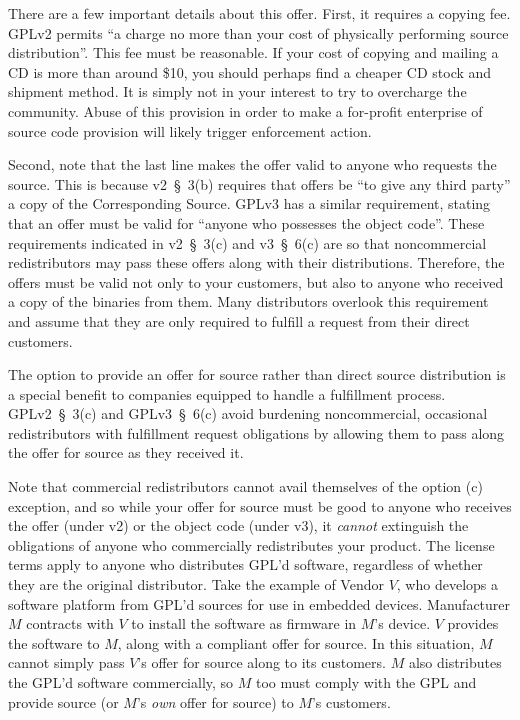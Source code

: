 There are a few important details about this offer.  First, it requires a
copying fee.  GPLv2 permits ``a charge no more than your cost of
physically performing source distribution''.  This fee must be reasonable.
If your cost of copying and mailing a CD is more than around \$10, you
should perhaps find a cheaper CD stock and shipment method.  It is simply
not in your interest to try to overcharge the community.  Abuse of this
provision in order to make a for-profit enterprise of source code
provision will likely trigger enforcement action.

Second, note that the last line makes the offer valid to anyone who
requests the source.  This is because v2~\S~3(b) requires that offers be
``to give any third party'' a copy of the Corresponding Source.  GPLv3 has
a similar requirement, stating that an offer must be valid for ``anyone
who possesses the object code''.  These requirements indicated in
v2~\S~3(c) and v3~\S~6(c) are so that noncommercial redistributors may
pass these offers along with their distributions.  Therefore, the offers
must be valid not only to your customers, but also to anyone who received
a copy of the binaries from them.  Many distributors overlook this
requirement and assume that they are only required to fulfill a request
from their direct customers.

The option to provide an offer for source rather than direct source
distribution is a special benefit to companies equipped to handle a
fulfillment process.  GPLv2~\S~3(c) and GPLv3~\S~6(c) avoid burdening
noncommercial, occasional redistributors with fulfillment request
obligations by allowing them to pass along the offer for source as they
received it.

Note that commercial redistributors cannot avail themselves of the option
(c) exception, and so while your offer for source must be good to anyone
who receives the offer (under v2) or the object code (under v3), it
\emph{cannot} extinguish the obligations of anyone who commercially
redistributes your product.  The license terms apply to anyone who
distributes GPL'd software, regardless of whether they are the original
distributor.  Take the example of Vendor $V$, who develops a software
platform from GPL'd sources for use in embedded devices.  Manufacturer $M$
contracts with $V$ to install the software as firmware in $M$'s device.
$V$ provides the software to $M$, along with a compliant offer for source.
In this situation, $M$ cannot simply pass $V$'s offer for source along to
its customers.  $M$ also distributes the GPL'd software commercially, so
$M$ too must comply with the GPL and provide source (or $M$'s \emph{own}
offer for source) to $M$'s customers.

